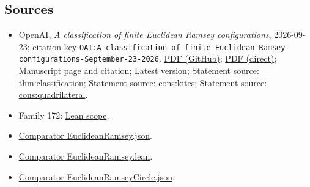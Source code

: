 \documentclass[11pt]{article}
\begin{document}
\subsection{Sources}
\begin{itemize}
\item OpenAI, \emph{A classification of finite Euclidean Ramsey configurations}, 2026-09-23; citation key \texttt{OAI:A-classification-of-finite-Euclidean-Ramsey-configurations-September-23-2026}. \href{https://github.com/openai/math/blob/adc7f1241b42e322a6451854ab7e4b4c146bf78a/preprints/A-classification-of-finite-Euclidean-Ramsey-configurations-September-23-2026/paper.pdf}{PDF (GitHub)}; \href{https://github.com/openai/math/raw/adc7f1241b42e322a6451854ab7e4b4c146bf78a/preprints/A-classification-of-finite-Euclidean-Ramsey-configurations-September-23-2026/paper.pdf}{PDF (direct)}; \href{https://github.com/openai/math/blob/adc7f1241b42e322a6451854ab7e4b4c146bf78a/preprints/A-classification-of-finite-Euclidean-Ramsey-configurations-September-23-2026/README.md}{Manuscript page and citation}; \href{https://github.com/openai/math/blob/main/preprints/A-classification-of-finite-Euclidean-Ramsey-configurations-September-23-2026/paper.pdf}{Latest version}; Statement source: \href{https://github.com/openai/math/blob/adc7f1241b42e322a6451854ab7e4b4c146bf78a/preprints/A-classification-of-finite-Euclidean-Ramsey-configurations-September-23-2026/build/sections/01-introduction.tex\#L74}{thm:classification}; Statement source: \href{https://github.com/openai/math/blob/adc7f1241b42e322a6451854ab7e4b4c146bf78a/preprints/A-classification-of-finite-Euclidean-Ramsey-configurations-September-23-2026/build/sections/07-consequences.tex\#L124}{cons:kites}; Statement source: \href{https://github.com/openai/math/blob/adc7f1241b42e322a6451854ab7e4b4c146bf78a/preprints/A-classification-of-finite-Euclidean-Ramsey-configurations-September-23-2026/build/sections/07-consequences.tex\#L106}{cons:quadrilateral}.
\item Family 172: \href{https://github.com/openai/math/blob/adc7f1241b42e322a6451854ab7e4b4c146bf78a/lean/docs/172.md}{Lean scope}.
\item \href{https://github.com/openai/math/blob/adc7f1241b42e322a6451854ab7e4b4c146bf78a/lean/ComparatorChallenges/EuclideanRamsey.json}{Comparator EuclideanRamsey.json}.
\item \href{https://github.com/openai/math/blob/adc7f1241b42e322a6451854ab7e4b4c146bf78a/lean/ComparatorChallenges/EuclideanRamsey.lean}{Comparator EuclideanRamsey.lean}.
\item \href{https://github.com/openai/math/blob/adc7f1241b42e322a6451854ab7e4b4c146bf78a/lean/ComparatorChallenges/EuclideanRamseyCircle.json}{Comparator EuclideanRamseyCircle.json}.

\end{itemize}
\end{document}

